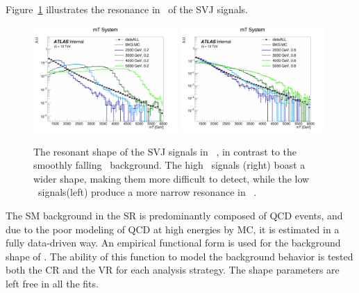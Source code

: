 Figure~\ref{fig:mt_mass} illustrates the resonance in \mt~of the SVJ signals.
\begin{figure}[!htbp]
\centering
    \includegraphics[width=0.49\textwidth]{figures/ch8/mt_mass_lowrinv}
    \includegraphics[width=0.49\textwidth]{figures/ch8/mt_mass_highrinv}
    \caption{The resonant shape of the SVJ signals in \mt~, in contrast to the smoothly falling \mt~background. The high \rinv~signals (right) boast a wider shape, making them more difficult to detect, while the low \rinv~signals(left) produce a more narrow resonance in \mt~. 
    \label{fig:mt_mass}}
\end{figure}

The SM background in the SR is predominantly composed of QCD events, and due to the poor modeling of QCD at high energies by MC, it is estimated in a fully data-driven way. 
An empirical functional form is used for the background shape of \mt.
The ability of this function to model the background behavior is tested both the CR and the VR for each analysis strategy. The shape parameters are left free in all the fits.

